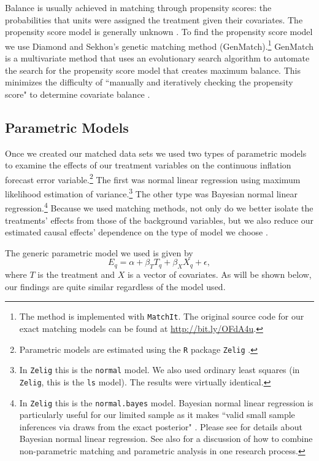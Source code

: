 \documentclass[a4paper]{article}\usepackage{graphicx, color}
\begin{document}
Balance is usually achieved in matching through propensity scores: the probabilities that units were assigned the treatment given their covariates. The propensity score model is generally unknown \citep{Drake1993}. To find the propensity score model we use Diamond and Sekhon's \citeyearpar{Diamond2012} genetic matching method (GenMatch).\footnote{The method is implemented with {\tt{MatchIt}}. The original source code for our exact matching models can be found at {\url{http://bit.ly/OFdA4u}}.} GenMatch is a multivariate method that uses an evolutionary search algorithm to automate the search for the propensity score model that creates maximum balance. This minimizes the difficulty of ``manually and iteratively checking the propensity score" to determine covariate balance \citep[][2]{Diamond2012}. 


\subsection{Parametric Models}

Once we created our matched data sets we used two types of parametric models to examine the effects of our treatment variables on the continuous inflation forecast error variable.\footnote{Parametric models are estimated using the \texttt{R} package \texttt{Zelig} \citep{Zelig2012}.} The first was normal linear regression using maximum likelihood estimation of variance.\footnote{In {\tt{Zelig}} this is the {\tt{normal}} model. We also used ordinary least squares (in \texttt{Zelig}, this is the \texttt{ls} model). The results were virtually identical.} The other type was Bayesian normal linear regression.\footnote{In {\tt{Zelig}} this is the {\tt{normal.bayes}} model. Bayesian normal linear regression is particularly useful for our limited sample as it makes ``valid small sample inferences via draws from the exact posterior" \citep[][38]{Zelig2012}. Please see \cite{Goodrich2007} for details about Bayesian normal linear regression.  See also \cite{Imai2008} for a discussion of how to combine non-parametric matching and parametric analysis in one research process.} Because we used  matching methods, not only do we better isolate the treatments' effects from those of the background variables, but we also reduce our estimated causal effects' dependence on the type of model we choose \cite[200--201]{Ho2007}.

The generic parametric model we used is given by
%
\begin{equation}
    E_{q} = \alpha + \beta_{T} T_{q} + \beta_{X} X_{q} + \epsilon,
\end{equation}
%
where $T$ is the treatment and $X$ is a vector of covariates. As will be shown below, our findings are quite similar regardless of the model used.
\end{document}
